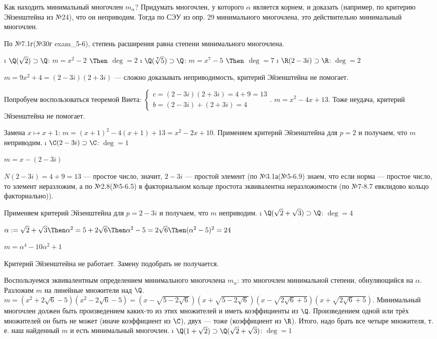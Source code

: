 \begin{solution}
Как находить минимальный многочлен $m_\alpha$? Придумать многочлен, у которого $\alpha$ является корнем, и доказать (например, по критерию Эйзенштейна из №24), что он неприводим. Тогда по СЭУ из опр. 29 минимального многочлена, это действительно минимальный многочлен.

По №7.1г(№30г exam\_5-6), степень расширения равна степени минимального многочлена.

\begin{itemize}
\tightlist
\i
  \(\Q(\sqrt2) \supset \Q\): $m = x^2-2$ $\Then$ \(\deg = 2\)
\i
  \(\Q(\sqrt[7]{5}) \supset \Q\): $m = x^7-5$ $\Then$ \(\deg = 7\)
\i
  \(\R(2-3i) \supset \R\): \(\deg = 2\)
  
  $m = 9x^2+4 = (2-3i)(2+3i)$ --- сложно доказывать неприводимость, критерий Эйзенштейна не помогает.
  
  Попробуем воспользоваться теоремой Виета: $\begin{cases} c=(2-3i)(2+3i)=4+9=13 \\ b=(2-3i)+(2+3i)=4 \end{cases}$. $m = x^2-4x+13$. Тоже неудача, критерий Эйзенштейна не помогает.
  
  Замена $x \mapsto x+1$: $m = (x+1)^2-4(x+1)+13 = x^2-2x+10$.
  Применяем критерий Эйзенштейна для $p=2$ и получаем, что $m$ неприводим.
\i
  \(\C(2-3i) \supset \C\): \(\deg = 1\)
  
  $m=x-(2-3i)$
  
  $N(2-3i) = 4+9=13$ --- простое число, значит, $2-3i$ --- простой элемент (по №3.1а(№5-6.9) знаем, что если норма --- простое число, то элемент неразложим, а по №2.8(№5-6.5) в факториальном кольце простота эквивалентна неразложимости (по №7-8.7 евклидово кольцо факториально)).
  
  Применяем критерий Эйзенштейна для $p=2-3i$ и получаем, что $m$ неприводим.
\i
  \(\Q(\sqrt2+\sqrt{3}) \supset \Q\): \(\deg = 4\)
  
  $\alpha := \sqrt2+\sqrt{3} \Then \alpha^2 = 5+2\sqrt6 \Then \alpha^2-5=2\sqrt6 \Then (\alpha^2-5)^2 = 24$
  
  $m = \alpha^4-10\alpha^2+1$ 
  
  Критерий Эйзенштейна не работает. Замену подобрать не получается. 
  
  Воспользуемся эквивалентным определением минимального многочлена $m_\alpha$: это многочлен минимальной степени, обнуляющийся на $\alpha$.
  Разложим $m$ на линейные множители над $\Q$. $m = (x^2+2\sqrt6-5)(x^2-2\sqrt6-5) = (x-\sqrt{5-2\sqrt6})(x+\sqrt{5-2\sqrt6})(x-\sqrt{2\sqrt6+5})(x+\sqrt{2\sqrt6+5})$. Минимальный многочлен должен быть произведением каких-то из этих множителей и иметь коэффициенты из $\Q$. Произведением одной или трёх множителей он быть не может (иначе коэффициент из $\C$), двух --- тоже (коэффициент из $\R$). Итого, надо брать все четыре множителя, т. е. наш найденный $m$ и есть минимальный многочлен.
\i
  \(\Q(1+\sqrt2) \supset \Q(\sqrt2+\sqrt{3})\): \(\deg = 1\)
  

\end{itemize}
\end{solution}
